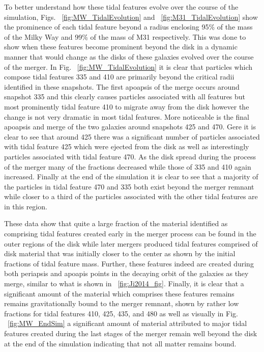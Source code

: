 \documentclass[fleqn,usenatbib]{mnras}
\begin{document}
To better understand how these tidal features evolve over the course of the simulation, Figs. ~\ref{fig:MW_TidalEvolution} and ~\ref{fig:M31_TidalEvolution} show the prominence of each tidal feature beyond a radius enclosing 95\% of the mass of the Milky Way and 99\% of the mass of M31 respectively. This was done to show when these features become prominent beyond the disk in a dynamic manner that would change as the disks of these galaxies evolved over the course of the merger. In Fig. ~\ref{fig:MW_TidalEvolution} it is clear that particles which compose tidal features 335 and 410 are primarily beyond the critical radii identified in these snapshots. The first apoapsis of the merge occurs around snapshot 335 and this clearly causes particles associated with all features but most prominently tidal feature 410 to migrate away from the disk however the change is not very dramatic in most tidal features. More noticeable is the final apoapsis and merge of the two galaxies around snapshots 425 and 470. Gere it is clear to see that around 425 there was a significant number of particles associated with tidal feature 425 which were ejected from the disk as well as interestingly particles associated with tidal feature 470. As the disk spread during the process of the merger many of the fractions decreased while those of 335 and 410 again increased. Finally at the end of the simulation it is clear to see that a majority of the particles in tidal feature 470 and 335 both exist beyond the merger remnant while closer to a third of the particles associated with the other tidal features are in this region.

These data show that quite a large fraction of the material identified as comprising tidal features created early in the merger process can be found in the outer regions of the disk while later mergers produced tidal features comprised of disk material that was initially closer to the center as shown by the initial fractions of tidal feature mass. Further, these features indeed are created during both periapsis and apoapis points in the decaying orbit of the galaxies as they merge, similar to what is shown in ~\ref{fig:Ji2014_fig}. Finally, it is clear that a significant amount of the material which comprises these features remains remains gravitationally bound to the merger remnant, shown by rather low fractions for tidal features 410, 425, 435, and 480 as well as visually in Fig. ~\ref{fig:MW_EndSim} a significant amount of material attributed to major tidal features created during the last stages of the merger remain well beyond the disk at the end of the simulation indicating that not all matter remains bound.
\end{document}
